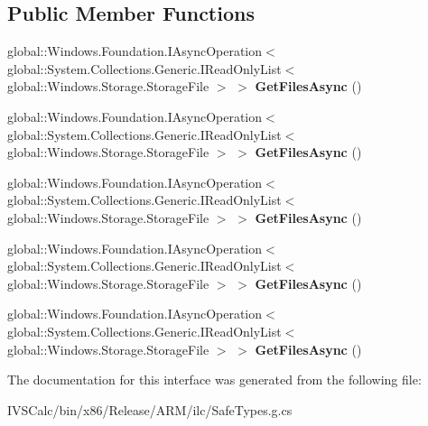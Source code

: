 \subsection*{Public Member Functions}
\begin{DoxyCompactItemize}
\item 
\mbox{\label{interface_windows_1_1_storage_1_1_search_1_1_i_storage_file_query_result_a7412ff2803158d10742be23abc1029af}} 
global\+::\+Windows.\+Foundation.\+I\+Async\+Operation$<$ global\+::\+System.\+Collections.\+Generic.\+I\+Read\+Only\+List$<$ global\+::\+Windows.\+Storage.\+Storage\+File $>$ $>$ {\bfseries Get\+Files\+Async} ()
\item 
\mbox{\label{interface_windows_1_1_storage_1_1_search_1_1_i_storage_file_query_result_a7412ff2803158d10742be23abc1029af}} 
global\+::\+Windows.\+Foundation.\+I\+Async\+Operation$<$ global\+::\+System.\+Collections.\+Generic.\+I\+Read\+Only\+List$<$ global\+::\+Windows.\+Storage.\+Storage\+File $>$ $>$ {\bfseries Get\+Files\+Async} ()
\item 
\mbox{\label{interface_windows_1_1_storage_1_1_search_1_1_i_storage_file_query_result_a7412ff2803158d10742be23abc1029af}} 
global\+::\+Windows.\+Foundation.\+I\+Async\+Operation$<$ global\+::\+System.\+Collections.\+Generic.\+I\+Read\+Only\+List$<$ global\+::\+Windows.\+Storage.\+Storage\+File $>$ $>$ {\bfseries Get\+Files\+Async} ()
\item 
\mbox{\label{interface_windows_1_1_storage_1_1_search_1_1_i_storage_file_query_result_a7412ff2803158d10742be23abc1029af}} 
global\+::\+Windows.\+Foundation.\+I\+Async\+Operation$<$ global\+::\+System.\+Collections.\+Generic.\+I\+Read\+Only\+List$<$ global\+::\+Windows.\+Storage.\+Storage\+File $>$ $>$ {\bfseries Get\+Files\+Async} ()
\item 
\mbox{\label{interface_windows_1_1_storage_1_1_search_1_1_i_storage_file_query_result_a7412ff2803158d10742be23abc1029af}} 
global\+::\+Windows.\+Foundation.\+I\+Async\+Operation$<$ global\+::\+System.\+Collections.\+Generic.\+I\+Read\+Only\+List$<$ global\+::\+Windows.\+Storage.\+Storage\+File $>$ $>$ {\bfseries Get\+Files\+Async} ()
\end{DoxyCompactItemize}


The documentation for this interface was generated from the following file\+:\begin{DoxyCompactItemize}
\item 
I\+V\+S\+Calc/bin/x86/\+Release/\+A\+R\+M/ilc/Safe\+Types.\+g.\+cs\end{DoxyCompactItemize}
